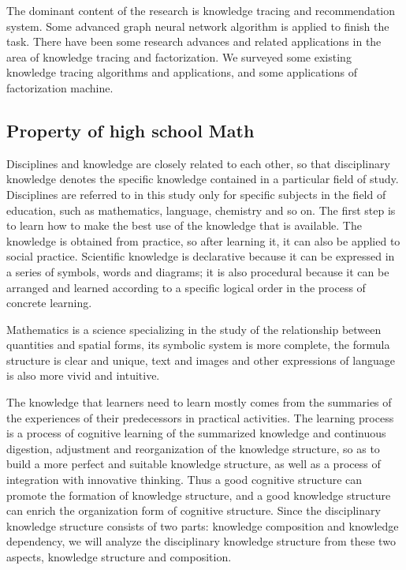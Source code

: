 The dominant content of the research is knowledge tracing and recommendation system. Some advanced graph neural network algorithm is applied to finish the task. There have been some research advances and related applications in the area of knowledge tracing and factorization. We surveyed some existing knowledge tracing algorithms and applications, and some applications of factorization machine.

\subsection{Property of high school Math}
Disciplines and knowledge are closely related to each other, so that disciplinary knowledge denotes the specific knowledge contained in a particular field of study. Disciplines are referred to in this study only for specific subjects in the field of education, such as mathematics, language, chemistry and so on. The first step is to learn how to make the best use of the knowledge that is available. The knowledge is obtained from practice, so after learning it, it can also be applied to social practice. Scientific knowledge is declarative because it can be expressed in a series of symbols, words and diagrams; it is also procedural because it can be arranged and learned according to a specific logical order in the process of concrete learning.

Mathematics is a science specializing in the study of the relationship between quantities and spatial forms, its symbolic system is more complete, the formula structure is clear and unique, text and images and other expressions of language is also more vivid and intuitive.

The knowledge that learners need to learn mostly comes from the summaries of the experiences of their predecessors in practical activities. The learning process is a process of cognitive learning of the summarized knowledge and continuous digestion, adjustment and reorganization of the knowledge structure, so as to build a more perfect and suitable knowledge structure, as well as a process of integration with innovative thinking. Thus a good cognitive structure can promote the formation of knowledge structure, and a good knowledge structure can enrich the organization form of cognitive structure. Since the disciplinary knowledge structure consists of two parts: knowledge composition and knowledge dependency, we will analyze the disciplinary knowledge structure from these two aspects, knowledge structure and composition.

